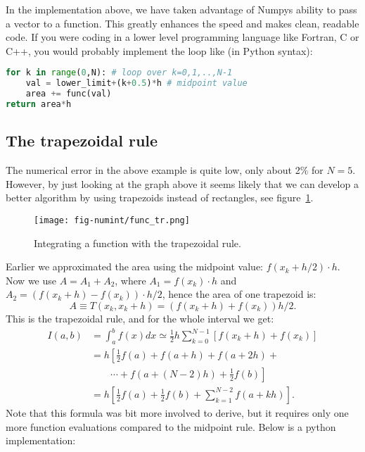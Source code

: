\documentclass[graybox,sectrefs,envcountresetchap,open=right,final]{svmonodo}
\newenvironment{graybox2admon}[1][]{
\begin{graybox2mdframed}[frametitle=#1]
}
{
\end{graybox2mdframed}
}
\begin{document}
\begin{graybox2admon}[Notice]
In the implementation above, we have taken advantage of Numpys ability to pass a vector to a function. This greatly enhances the speed and makes clean, readable code. If you were coding in a lower level programming language like Fortran, C or C++, you would probably implement the loop like (in Python syntax):





\begin{lstlisting}[language=python,style=blue1]
for k in range(0,N): # loop over k=0,1,..,N-1
    val = lower_limit+(k+0.5)*h # midpoint value
    area += func(val)
return area*h

\end{lstlisting}
\end{graybox2admon}




\subsection{The trapezoidal rule}
The numerical error in the above example is quite low, only about 2$\%$ for $N=5$. 
However, by just looking at the graph above it seems likely that we can develop a better algorithm by using trapezoids instead of rectangles, 
see figure~\ref{fig:numint:trap}.

\begin{figure}[!ht]  %
  \centerline{\texttt{[image: fig-numint/func\_tr.png]}}
  \caption{
  Integrating a function with the trapezoidal rule. \label{fig:numint:trap}
  }
\end{figure}

Earlier we approximated the area using the midpoint value: $f(x_k+h/2)\cdot h$. Now we use $A=A_1+A_2$, where $A_1=f(x_k)\cdot h$ 
and $A_2=(f(x_k+h)-f(x_k))\cdot h/2$, hence the area of one trapezoid is:
\begin{equation}
A\equiv T(x_k,x_k+h)=(f(x_k+h)+f(x_k))h/2.
\end{equation}
This is the trapezoidal rule, and for the whole interval we get:
\begin{align}
I(a,b)&=\int_a^bf(x)dx\simeq\frac{1}{2}h\sum_{k=0}^{N-1}\left[f(x_k+h)+f(x_k)\right] \nonumber \\ 
&=h\left[\frac{1}{2}f(a)+f(a+h) + f(a+2h) +\nonumber\right. \\ 
&\left.\qquad\cdots + f(a+(N-2)h)+\frac{1}{2}f(b)\right]\nonumber \\ 
&=h\left[\frac{1}{2}f(a)+\frac{1}{2}f(b)+\sum_{k=1}^{N-2}f(a+k h)\right].
\end{align}
Note that this formula was bit more involved to derive, but it requires only one more function evaluations compared to the midpoint rule. 
Below is a python implementation:
\end{document}

